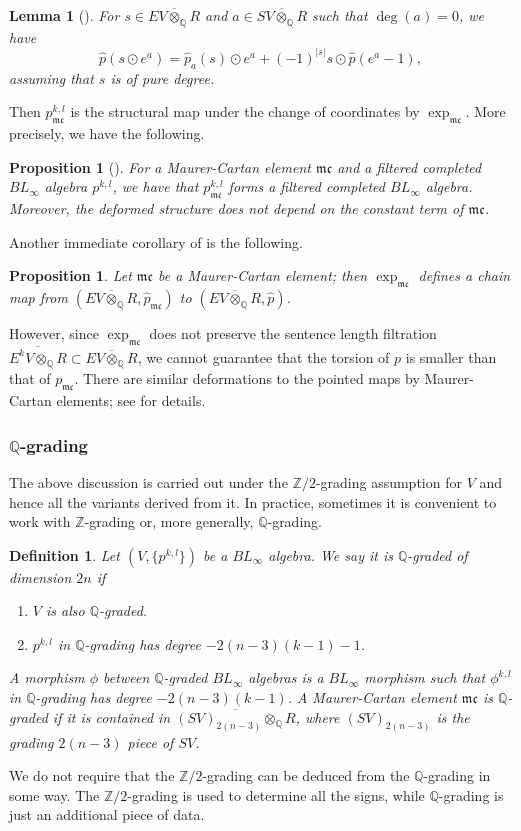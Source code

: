 \documentclass[11pt]{amsart}
\numberwithin{equation}{section}
\newtheorem{definition}[theorem]{\textbf{Definition}}
\newtheorem{proposition}[theorem]{\textbf{Proposition}}
\newtheorem{lemma}[theorem]{\textbf{Lemma}}
\def\Z{{\mathbb Z}}
\def\Q{{\mathbb Q}}
\def\mc{{\mathfrak {mc}}}
\begin{document}
\begin{lemma}[{\cite[Lemma 2.20]{moreno2024rsft}}]\label{lem:pmc}
For $s\in \overline{EV\otimes_{\Q}R}$ and $a\in \overline{SV\otimes_{\Q}R}$ such that $\deg(a)=0$, we have $$\widehat{p}(s\odot e^a)=\widehat{p}_a(s)\odot e^a+(-1)^{|s|} s\odot \widehat{p}(e^a-1),$$
assuming that $s$ is of pure degree.
\end{lemma}

Then $p^{k,l}_{\mc}$ is the structural map under the change of coordinates by $\exp_{\mc}$. More precisely, we have the following.
\begin{proposition}[{\cite[Proposition 2.21]{moreno2024rsft}}]
    For a Maurer-Cartan element $\mc$ and a filtered completed $BL_\infty$ algebra $p^{k,l}$, we have that $p^{k,l}_{\mc}$ forms a filtered completed $BL_\infty$ algebra. Moreover, the deformed structure does not depend on the constant term of $\mc$.
\end{proposition}

Another immediate corollary of  is the following.
\begin{proposition}\label{prop:chain_mc}
Let $\mathfrak{mc}$ be a Maurer-Cartan element; then $\exp_{\mc}$ defines a chain map from $(\overline{EV\otimes_{\Q}R}, \widehat{p}_{\mathfrak{mc}})$ to $(\overline{EV\otimes_{\Q}R}, \widehat{p})$.
 \end{proposition}
However, since $\exp_{\mc}$ does not preserve the sentence length filtration $\overline{E^kV\otimes_{\Q}R}\subset \overline{EV\otimes_{\Q}R}$, we cannot guarantee that the torsion of $p$ is smaller than that of $p_{\mathfrak{mc}}$. There are similar deformations to the pointed maps by Maurer-Cartan elements; see \cite[\S 2.7]{moreno2024rsft} for details.

\subsubsection{$\Q$-grading}
The above discussion is carried out under the $\Z/2$-grading assumption for $V$ and hence all the variants derived from it. In practice, sometimes it is convenient to work with $\Z$-grading or, more generally, $\Q$-grading. 
\begin{definition}\label{def:Q-grading}
    Let $(V,\{p^{k,l}\})$ be a $BL_\infty$ algebra. We say it is $\Q$-graded of dimension $2n$ if 
    \begin{enumerate}
        \item $V$ is also $\Q$-graded.
        \item $p^{k,l}$ in $\Q$-grading has degree $-2(n-3)(k-1)-1$.
    \end{enumerate}
    A morphism $\phi$ between $\Q$-graded $BL_\infty$ algebras is a $BL_\infty$ morphism such that $\phi^{k,l}$ in $\Q$-grading has degree $-2(n-3)(k-1)$. A Maurer-Cartan element $\mc$ is $\Q$-graded if it is contained in $\overline{(SV)_{2(n-3)}\otimes_{\Q} R}$, where $(SV)_{2(n-3)}$ is the grading $2(n-3)$ piece of $SV$. 
\end{definition}
We do not require that the $\Z/2$-grading can be deduced from the $\Q$-grading in some way. The $\Z/2$-grading is used to determine all the signs, while $\Q$-grading is just an additional piece of data. 
\end{document}
